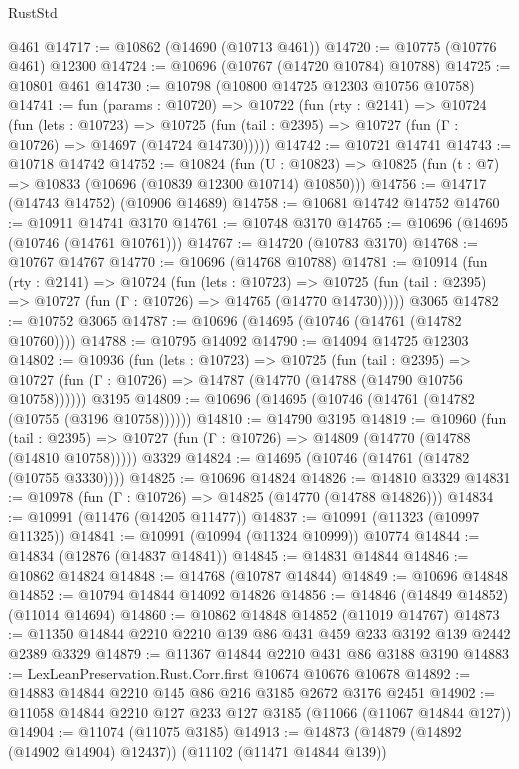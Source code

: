 \begin{lexlean}{RustStd}
\begin{coremodule}
    @461
@14717 := @10862 (@14690 (@10713 @461))
@14720 := @10775 (@10776 @461) @12300
@14724 := @10696 (@10767 (@14720 @10784) @10788)
@14725 := @10801 @461
@14730 := @10798 (@10800 @14725 @12303 @10756 @10758)
@14741 := fun (params : @10720) =>
  @10722
    (fun (rty : @2141) =>
    @10724
      (fun (lets : @10723) =>
      @10725 (fun (tail : @2395) => @10727 (fun (Γ : @10726) => @14697 (@14724 @14730)))))
@14742 := @10721 @14741
@14743 := @10718 @14742
@14752 := @10824
    (fun (U : @10823) => @10825 (fun (t : @7) => @10833 (@10696 (@10839 @12300 @10714) @10850)))
@14756 := @14717 (@14743 @14752) (@10906 @14689)
@14758 := @10681 @14742 @14752
@14760 := @10911 @14741 @3170
@14761 := @10748 @3170
@14765 := @10696 (@14695 (@10746 (@14761 @10761)))
@14767 := @14720 (@10783 @3170)
@14768 := @10767 @14767
@14770 := @10696 (@14768 @10788)
@14781 := @10914
    (fun (rty : @2141) =>
    @10724
      (fun (lets : @10723) =>
      @10725 (fun (tail : @2395) => @10727 (fun (Γ : @10726) => @14765 (@14770 @14730)))))
    @3065
@14782 := @10752 @3065
@14787 := @10696 (@14695 (@10746 (@14761 (@14782 @10760))))
@14788 := @10795 @14092
@14790 := @14094 @14725 @12303
@14802 := @10936
    (fun (lets : @10723) =>
    @10725
      (fun (tail : @2395) =>
      @10727 (fun (Γ : @10726) => @14787 (@14770 (@14788 (@14790 @10756 @10758))))))
    @3195
@14809 := @10696 (@14695 (@10746 (@14761 (@14782 (@10755 (@3196 @10758))))))
@14810 := @14790 @3195
@14819 := @10960
    (fun (tail : @2395) => @10727 (fun (Γ : @10726) => @14809 (@14770 (@14788 (@14810 @10758)))))
    @3329
@14824 := @14695 (@10746 (@14761 (@14782 (@10755 @3330))))
@14825 := @10696 @14824
@14826 := @14810 @3329
@14831 := @10978 (fun (Γ : @10726) => @14825 (@14770 (@14788 @14826)))
@14834 := @10991 (@11476 (@14205 @11477))
@14837 := @10991 (@11323 (@10997 @11325))
@14841 := @10991 (@10994 (@11324 @10999)) @10774
@14844 := @14834 (@12876 (@14837 @14841))
@14845 := @14831 @14844
@14846 := @10862 @14824
@14848 := @14768 (@10787 @14844)
@14849 := @10696 @14848
@14852 := @10794 @14844 @14092 @14826
@14856 := @14846 (@14849 @14852) (@11014 @14694)
@14860 := @10862 @14848 @14852 (@11019 @14767)
@14873 := @11350 @14844 @2210 @2210 @139 @86 @431 @459 @233 @3192 @139 @2442 @2389 @3329
@14879 := @11367 @14844 @2210 @431 @86 @3188 @3190
@14883 := LexLeanPreservation.Rust.Corr.first @10674 @10676 @10678
@14892 := @14883 @14844 @2210 @145 @86 @216 @3185 @2672 @3176 @2451
@14902 := @11058 @14844 @2210 @127 @233 @127 @3185 (@11066 (@11067 @14844 @127))
@14904 := @11074 (@11075 @3185)
@14913 := @14873 (@14879 (@14892 (@14902 @14904) @12437)) (@11102 (@11471 @14844 @139))

\end{coremodule}
\end{lexlean}
